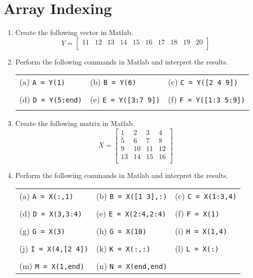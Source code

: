 \documentclass{pass}
\begin{document}
\section*{Array Indexing}
\begin{enumerate}[resume]
\item Create the following vector in Matlab.\\
$$Y = \left[ {\begin{array}{cccccccccc}
 	11 & 12 & 13 & 14 & 15 & 16 & 17 & 18 & 19 & 20 \\
\end{array} } \right]$$
\item Perform the following commands in Matlab and interpret the results.\\
\begin{tabularx}{\textwidth}{XXX}
(a) \texttt{A = Y(1)} & 
(b) \texttt{B = Y(6)} &
(c) \texttt{C = Y([2 4 9])} \\ \\
(d) \texttt{D = Y(5:end)} &
(e) \texttt{E = Y([3:7 9])} &
(f) \texttt{F = Y([1:3 5:9])} \\ \\
 \end{tabularx}
\pagebreak
\item Create the following matrix in Matlab.
$$X = \left[ {\begin{array}{cccc}
 	1 & 2 & 3 & 4 \\
 	5 & 6 & 7 & 8 \\
	9 & 10 & 11 & 12 \\
	13 & 14 & 15 & 16 \\
\end{array} } \right]$$
\item Perform the following commands in Matlab and interpret the results.\\
\begin{tabularx}{\textwidth}{XXX}
(a) \texttt{A = X(:,1)} & 
(b) \texttt{B = X([1 3],:)} &
(c) \texttt{C = X(1:3,4)} \\ \\
(d) \texttt{D = X(3,3:4)} &
(e) \texttt{E = X(2:4,2:4)} &
(f) \texttt{F = X(1)} \\ \\
(g) \texttt{G = X(3)} &
(h) \texttt{G = X(10)} &
(i) \texttt{H = X(1,4)} \\ \\
(j) \texttt{I = X(4,[2 4])} &
(k) \texttt{K = X(:,:)} &
(l) \texttt{L = X(:)} \\ \\
(m) \texttt{M = X(1,end)} &
(n) \texttt{N = X(end,end)} &
\end{tabularx}
\end{enumerate}
\end{document}
